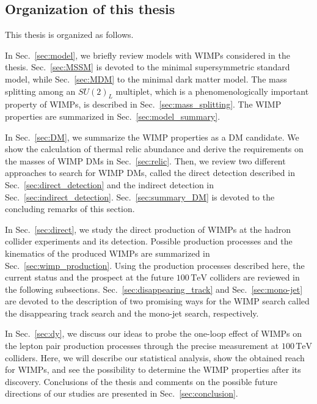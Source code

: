 \documentclass[12pt,twoside,book]{article}
\begin{document}
\clearpage


\subsection{Organization of this thesis}

This thesis is organized as follows.

In Sec.~\ref{sec:model}, we briefly review models with WIMPs considered in the thesis.
Sec.~\ref{sec:MSSM} is devoted to the minimal supersymmetric standard model, while Sec.~\ref{sec:MDM} to the minimal dark matter model.
The mass splitting among an $SU(2)_L$ multiplet, which is a phenomenologically important property of WIMPs, is described in Sec.~\ref{sec:mass_splitting}.
The WIMP properties are summarized in Sec.~\ref{sec:model_summary}.

In Sec.~\ref{sec:DM}, we summarize the WIMP properties as a DM candidate.
We show the calculation of thermal relic abundance and derive the requirements on the masses of WIMP DMs in Sec.~\ref{sec:relic}.
Then, we review two different approaches to search for WIMP DMs, called the direct detection described in Sec.~\ref{sec:direct_detection} and the indirect detection in Sec.~\ref{sec:indirect_detection}.
Sec.~\ref{sec:summary_DM} is devoted to the concluding remarks of this section.

In Sec.~\ref{sec:direct}, we study the direct production of WIMPs at the hadron collider experiments and its detection.
Possible production processes and the kinematics of the produced WIMPs are summarized in Sec.~\ref{sec:wimp_production}.
Using the production processes described here, the current status and the prospect at the future $100\,\mathrm{TeV}$ colliders are reviewed in the following subsections.
Sec.~\ref{sec:disappearing_track} and Sec.~\ref{sec:mono-jet} are devoted to the description of two promising ways for the WIMP search called the disappearing track search and the mono-jet search, respectively.

In Sec.~\ref{sec:dy}, we discuss our ideas to probe the one-loop effect of WIMPs on the lepton pair production processes through the precise measurement at $100\,\mathrm{TeV}$ colliders.
Here, we will describe our statistical analysis, show the obtained reach for WIMPs, and see the possibility to determine the WIMP properties after its discovery.
Conclusions of the thesis and comments on the possible future directions of our studies are presented in Sec.~\ref{sec:conclusion}.
\end{document}
